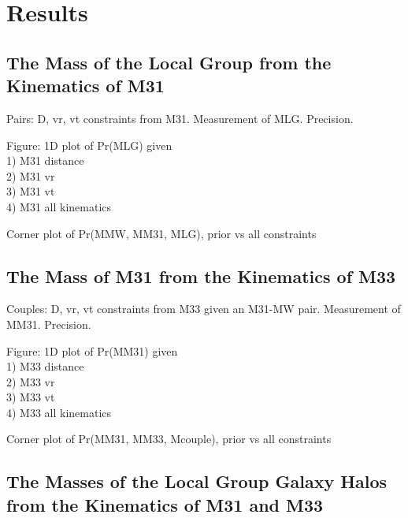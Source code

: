 \documentclass{emulateapj}
\begin{document}

\section{Results}
\label{sec:results}


\subsection{The Mass of the Local Group from the Kinematics of M31}
\label{sec:results:LGmass}

Pairs: D, vr, vt constraints from M31. 
Measurement of  MLG. Precision. 

Figure: 1D plot of Pr(MLG) given \\
  1) M31 distance\\
  2) M31 vr\\
  3) M31 vt\\
  4) M31 all kinematics

Corner plot of Pr(MMW, MM31, MLG), prior vs all constraints



\subsection{The Mass of M31 from the Kinematics of M33}
\label{sec:results:M31mass}

Couples: D, vr, vt constraints from M33 given an M31-MW pair. 
Measurement of  MM31. Precision. 

Figure: 1D plot of Pr(MM31) given \\
  1) M33 distance\\
  2) M33 vr\\
  3) M33 vt\\
  4) M33 all kinematics

Corner plot of Pr(MM31, MM33, Mcouple), prior vs all constraints


\subsection{The Masses of the Local Group Galaxy Halos from the Kinematics of M31 and M33}
\label{sec:results:jointanalysis}
\end{document}
